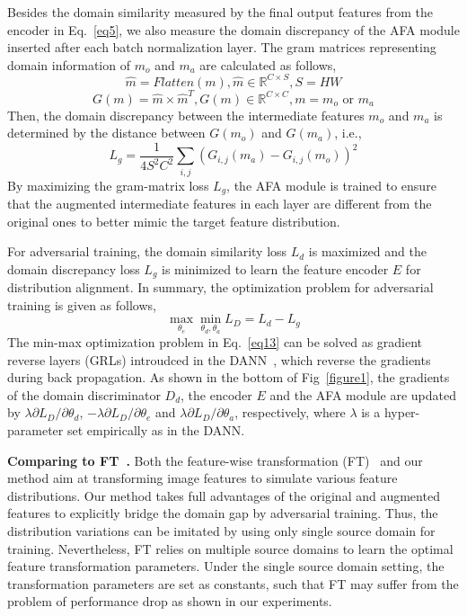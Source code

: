 \documentclass[runningheads]{utils/llncs}
\begin{document}
Besides the domain similarity measured by the final output features from the encoder in Eq.~\eqref{eq5}, 
we also measure the domain discrepancy of the AFA module inserted after each batch normalization layer.
The gram matrices representing domain information of $m_o$ and $m_a$ are calculated as follows,
\begin{equation}
\label{eq10}
\hat{m} = Flatten(m), \hat{m} \in \mathbb{R}^{C \times S}, S = HW
\end{equation}
\begin{equation}
\label{eq11}
G(m) =  \hat{m} \times \hat{m}^{T}, G(m) \in \mathbb{R}^{C \times C}, m = m_o \text{ or } m_a
\end{equation}
Then, the domain discrepancy between the intermediate features $m_o$ and $m_a$ is determined by the distance between $G({m}_{o})$ and $G({m}_{a})$, i.e.,
\begin{equation}
\label{eq12}
{L}_{g} = \frac{1}{4{S}^{2}{C}^{2}}\sum_{i,j}\left(G_{i,j}(m_a) - G_{i,j}(m_o)\right)^2
\end{equation}
By maximizing the gram-matrix loss $L_g$, the AFA module is trained to ensure that the augmented intermediate features in each layer are different from the original ones to better mimic the target feature distribution.


For adversarial training, the domain similarity loss $L_d$ is maximized and the domain discrepancy loss $L_g$ is minimized to learn the feature encoder $E$ for distribution alignment.
In summary, the optimization problem for adversarial training is given as follows,
\begin{equation}
\label{eq13}
\max_{\theta_e} \min_{\theta_d, \theta_a} {L}_{D} = {L}_{d}-{L}_{g}
\end{equation}
The min-max optimization problem in Eq.~\eqref{eq13} can be solved as gradient reverse layers (GRLs) introudced in the DANN~\cite{GaninUAGLLML17}, which reverse the gradients during back propagation.
As shown in the bottom of Fig~\ref{figure1}, the gradients of the domain discriminator $D_d$, the encoder $E$ and the AFA module are updated by $\lambda{\partial L_D}/{\partial \theta_d}$, $-\lambda{\partial L_D}/{\partial \theta_e}$ and $\lambda{\partial L_D}/{\partial \theta_a}$, respectively, where $\lambda$ is a hyper-parameter set empirically as in the DANN. 




\textbf{Comparing to FT~\cite{TsengLH020}.} 
Both the feature-wise transformation (FT)~\cite{TsengLH020} and our method aim at transforming image features to simulate various feature distributions.
Our method takes full advantages of the original and augmented features to explicitly bridge the domain gap by adversarial training.
Thus, the distribution variations can be imitated by using only single source domain for training.
Nevertheless, FT relies on multiple source domains to learn the optimal feature transformation parameters.
Under the single source domain setting, the transformation parameters are set as constants, such that FT may suffer from the problem of performance drop as shown in our experiments.
\end{document}
